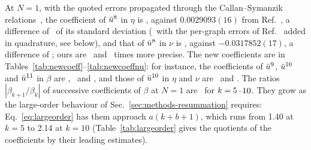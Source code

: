 At $N=1$, with the quoted errors propagated through the Callan--Symanzik relations~, the coefficient of
$\bar u^{8}$ in $\eta$ is \etaEight, against $0.0029093(16)$ from Ref.~\cite{Phi4tools2024}, a difference of
\etaEightPull\ of its standard deviation (\routeBzphietaeight\ with the per-graph errors of Ref.~\cite{Phi4tools2024}
added in quadrature, see below), and that of $\bar u^{8}$ in $\nu$ is \nuEight, against $-0.0317852(17)$, a
difference of \nuEightPull; ours are \etaEightGain\ and \nuEightGain\ times more precise. The new coefficients are in
Tables~\ref{tab:newcoeff}--\ref{tab:newcoeffnu}: for instance, the coefficients of $\bar u^{9}$, $\bar u^{10}$ and
$\bar u^{11}$ in $\beta$ are \betaNine, \betaTen\ and \betaEleven, and those of $\bar u^{10}$ in $\eta$ and $\nu$ are
\etaTen\ and \nuTen. The ratios $|\beta_{k+1}/\beta_k|$ of successive coefficients of $\beta$ at $N=1$ are \betaratios\
for $k=5$--$10$. They grow as the large-order behaviour of Sec.~\ref{sec:methods-resummation}
requires: Eq.~\eqref{eq:largeorder} has them approach $a(k+b+1)$, which runs from 1.40 at $k=5$ to 2.14 at $k=10$
(Table~\ref{tab:largeorder} gives the quotients of the coefficients by their leading estimates).

